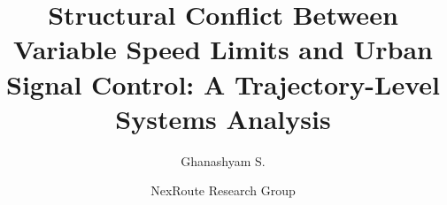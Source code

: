 \documentclass[3p,times,procedia]{elsarticle}
\begin{document}
\begin{frontmatter}


\title{Structural Conflict Between Variable Speed Limits and Urban Signal Control: A Trajectory-Level Systems Analysis}

\author[a]{Ghanashyam S.}
\author[a]{NexRoute Research Group}

\address[a]{Department of Computer Science and Transportation Engineering, NexRoute Research Group, Bengaluru, India}


\begin{abstract}

\end{abstract}
\end{frontmatter}
\end{document}
